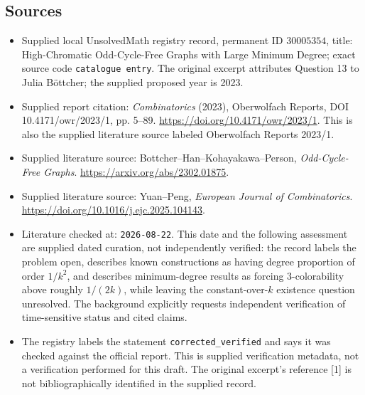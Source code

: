 \documentclass[11pt]{article}
\begin{document}
\subsection{Sources}
\begin{itemize}
\item Supplied local UnsolvedMath registry record, permanent ID \(30005354\), title: High-Chromatic Odd-Cycle-Free Graphs with Large Minimum Degree; exact source code \texttt{catalogue entry}. The original excerpt attributes Question 13 to Julia B\"ottcher; the supplied proposed year is 2023.
\item Supplied report citation: \emph{Combinatorics} (2023), Oberwolfach Reports, DOI 10.4171/owr/2023/1, pp. 5--89. \url{https://doi.org/10.4171/owr/2023/1}. This is also the supplied literature source labeled Oberwolfach Reports 2023/1.
\item Supplied literature source: Bottcher--Han--Kohayakawa--Person, \emph{Odd-Cycle-Free Graphs}. \url{https://arxiv.org/abs/2302.01875}.
\item Supplied literature source: Yuan--Peng, \emph{European Journal of Combinatorics}. \url{https://doi.org/10.1016/j.ejc.2025.104143}.
\item Literature checked at: \texttt{2026-08-22}. This date and the following assessment are supplied dated curation, not independently verified: the record labels the problem open, describes known constructions as having degree proportion of order \(1/k^2\), and describes minimum-degree results as forcing 3-colorability above roughly \(1/(2k)\), while leaving the constant-over-\(k\) existence question unresolved. The background explicitly requests independent verification of time-sensitive status and cited claims.
\item The registry labels the statement \texttt{corrected\_verified} and says it was checked against the official report. This is supplied verification metadata, not a verification performed for this draft. The original excerpt's reference [1] is not bibliographically identified in the supplied record.
\end{itemize}
\end{document}
